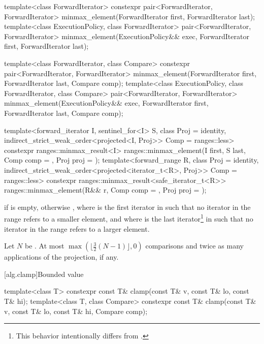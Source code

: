 %
\begin{itemdecl}
template<class ForwardIterator>
  constexpr pair<ForwardIterator, ForwardIterator>
    minmax_element(ForwardIterator first, ForwardIterator last);
template<class ExecutionPolicy, class ForwardIterator>
  pair<ForwardIterator, ForwardIterator>
    minmax_element(ExecutionPolicy&& exec,
                   ForwardIterator first, ForwardIterator last);

template<class ForwardIterator, class Compare>
  constexpr pair<ForwardIterator, ForwardIterator>
    minmax_element(ForwardIterator first, ForwardIterator last, Compare comp);
template<class ExecutionPolicy, class ForwardIterator, class Compare>
  pair<ForwardIterator, ForwardIterator>
    minmax_element(ExecutionPolicy&& exec,
                   ForwardIterator first, ForwardIterator last, Compare comp);

template<forward_iterator I, sentinel_for<I> S, class Proj = identity,
         indirect_strict_weak_order<projected<I, Proj>> Comp = ranges::less>
  constexpr ranges::minmax_result<I>
    ranges::minmax_element(I first, S last, Comp comp = {}, Proj proj = {});
template<forward_range R, class Proj = identity,
         indirect_strict_weak_order<projected<iterator_t<R>, Proj>> Comp = ranges::less>
  constexpr ranges::minmax_result<safe_iterator_t<R>>
    ranges::minmax_element(R&& r, Comp comp = {}, Proj proj = {});
\end{itemdecl}


\begin{itemdescr}
\pnum
\returns
{} if  is empty, otherwise
, where  is
the first iterator in  such that no iterator in the range refers
to a smaller element, and where  is the last iterator\footnote{This behavior
intentionally differs from .}
in  such that no iterator in the range refers to a larger element.

\pnum
\complexity
Let $N$ be .
At most $\max(\bigl\lfloor{\frac{3}{2}} (N-1)\bigr\rfloor, 0)$ comparisons and
twice as many applications of the projection, if any.
\end{itemdescr}

[alg.clamp]{Bounded value}

%
\begin{itemdecl}
template<class T>
  constexpr const T& clamp(const T& v, const T& lo, const T& hi);
template<class T, class Compare>
  constexpr const T& clamp(const T& v, const T& lo, const T& hi, Compare comp);
\end{itemdecl}

